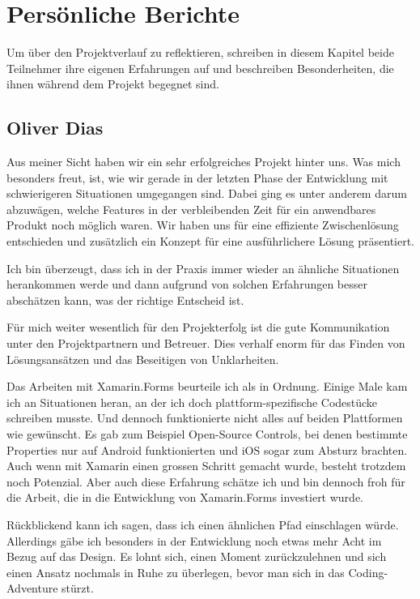 \section{Persönliche Berichte}
Um über den Projektverlauf zu reflektieren, schreiben in diesem Kapitel beide Teilnehmer ihre eigenen Erfahrungen auf und beschreiben Besonderheiten, die ihnen während dem Projekt begegnet sind. 

\subsection{Oliver Dias}
Aus meiner Sicht haben wir ein sehr erfolgreiches Projekt hinter uns. Was mich besonders freut, ist, wie wir gerade in der letzten Phase der Entwicklung mit schwierigeren Situationen umgegangen sind. Dabei ging es unter anderem darum abzuwägen, welche Features in der verbleibenden Zeit für ein anwendbares Produkt noch möglich waren. Wir haben uns für eine effiziente Zwischenlösung entschieden und zusätzlich ein Konzept für eine ausführlichere Lösung präsentiert. 

Ich bin überzeugt, dass ich in der Praxis immer wieder an ähnliche Situationen herankommen werde und dann aufgrund von solchen Erfahrungen besser abschätzen kann, was der richtige Entscheid ist. 

Für mich weiter wesentlich für den Projekterfolg ist die gute Kommunikation unter den Projektpartnern und Betreuer. Dies verhalf enorm für das Finden von Lösungsansätzen und das Beseitigen von Unklarheiten.

Das Arbeiten mit Xamarin.Forms beurteile ich als in Ordnung. Einige Male kam ich an Situationen heran, an der ich doch plattform-spezifische Codestücke schreiben musste. Und dennoch funktionierte nicht alles auf beiden Plattformen wie gewünscht. Es gab zum Beispiel Open-Source Controls, bei denen bestimmte Properties nur auf Android funktionierten und iOS sogar zum Absturz brachten. Auch wenn mit Xamarin einen grossen Schritt gemacht wurde, besteht trotzdem noch Potenzial. Aber auch diese Erfahrung schätze ich und bin dennoch froh für die Arbeit, die in die Entwicklung von Xamarin.Forms investiert wurde. 

Rückblickend kann ich sagen, dass ich einen ähnlichen Pfad einschlagen würde. Allerdings gäbe ich besonders in der Entwicklung noch etwas mehr Acht im Bezug auf das Design. Es lohnt sich, einen Moment zurückzulehnen und sich einen Ansatz nochmals in Ruhe zu überlegen, bevor man sich in das Coding-Adventure stürzt.
\newpage

